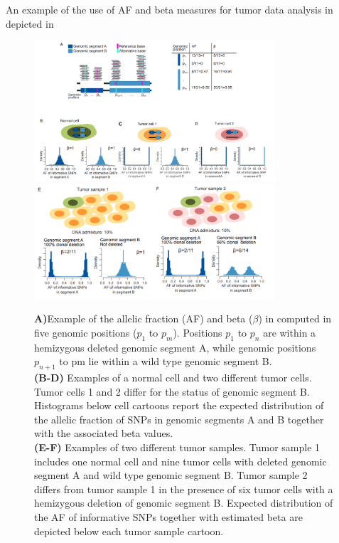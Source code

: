 An example of the use of AF and beta measures for tumor data analysis in depicted in 

\begin{figure}[htbp!]
	\centering
	\includegraphics[width=0.8\textwidth]{a.png}
	\includegraphics[width=0.8\textwidth]{b.png}
	\caption{\label{fig:a_b} 
	\textbf{A)}Example of the allelic fraction (AF) and beta ($\beta$) in computed in five genomic positions ($p_1$ to $p_m$). Positions $p_1$ to $p_n$ are within a hemizygous deleted genomic segment A, while genomic positions $p_{n+1}$ to pm lie within a wild type genomic segment B.\\
\textbf{(B-D)} Examples of a normal cell and two different tumor cells. Tumor cells 1 and 2 differ for the status of genomic segment B. Histograms below cell cartoons report the expected distribution of the allelic fraction of SNPs in genomic segments A and B together with the associated beta values.\\
\textbf{(E-F)} Examples of two different tumor samples. Tumor sample 1 includes one normal cell and nine tumor cells with deleted genomic segment A and wild type genomic segment B. Tumor sample 2 differs from tumor sample 1 in the presence of six tumor cells with a hemizygous deletion of genomic segment B.
Expected distribution of the AF of informative SNPs together with estimated beta are depicted below each tumor sample cartoon.}
\end{figure}

